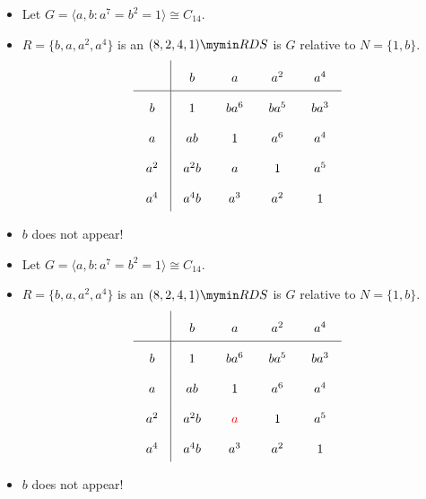 \documentclass{beamer}
\newcommand{\rds}[1]{#1 \mymin RDS}
\newcommand{\RR}[1]{\textcolor{red}{#1}}
\begin{document}
\begin{frame}

  \begin{itemize}
  \item Let $G=\langle a,b : a^7=b^2=1 \rangle \cong C_{14}$.
  \item $R=\{b,a,a^2,a^4\}$ is an $\rds{(8,2,4,1)}$ is $G$ relative to $N=\{1,b\}$.
    \[
      \arraycolsep=10.0pt\def\arraystretch{2.0}
      \begin{array}{c|cccc}
        \text{ } & b & a & a^2 & a^4 \\ \hline
        b & 1 & ba^6 & ba^5 & ba^3 \\
        a & ab & 1 & a^6 & a^4 \\
        a^2 & a^2b & a & 1 & a^5 \\
        a^4 & a^4b & a^3 & a^2 & 1
      \end{array}
    \]
  \item $b$ does not appear!
  \end{itemize}

\end{frame}

\begin{frame}

  \begin{itemize}
  \item Let $G=\langle a,b : a^7=b^2=1 \rangle \cong C_{14}$.
  \item $R=\{b,a,a^2,a^4\}$ is an $\rds{(8,2,4,1)}$ is $G$ relative to $N=\{1,b\}$.
    \[
      \arraycolsep=10.0pt\def\arraystretch{2.0}
      \begin{array}{c|cccc}
        \text{ } & b & a & a^2 & a^4 \\ \hline
        b & 1 & ba^6 & ba^5 & ba^3 \\
        a & ab & 1 & a^6 & a^4 \\
        a^2 & a^2b & \RR{ a } & 1 & a^5 \\
        a^4 & a^4b & a^3 & a^2 & 1
      \end{array}
    \]
  \item $b$ does not appear!
  \end{itemize}

\end{frame}
\end{document}
